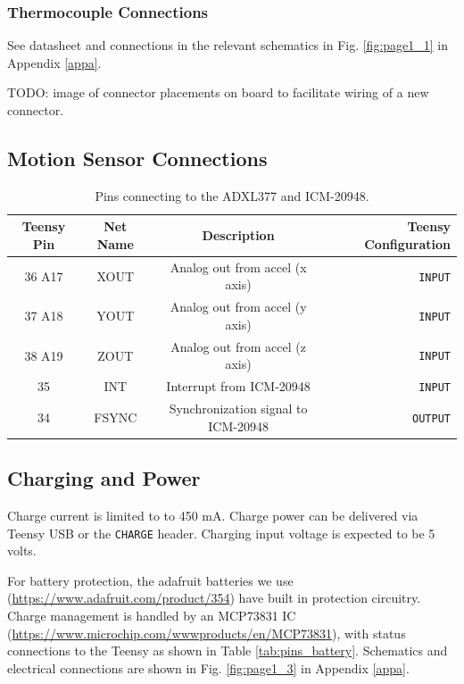 \documentclass{article}
\begin{document}
\subsubsection{Thermocouple Connections}
See datasheet and connections in the relevant schematics in Fig. \ref{fig:page1_1} in Appendix \ref{appa}.

TODO: image of connector placements on board to facilitate wiring of a new connector.


\subsection{Motion Sensor Connections}

\begin{table}[H]
    \centering
    \begin{tabular}{c|c|c|r}
    Teensy Pin & Net Name  & Description   & Teensy Configuration \\
    \hline 
    36 A17 & XOUT & Analog out from accel (x axis) & \texttt{INPUT} \\
    37 A18 & YOUT & Analog out from accel (y axis) & \texttt{INPUT} \\
    38 A19 & ZOUT & Analog out from accel (z axis) & \texttt{INPUT} \\
    35 & INT & Interrupt from ICM-20948 & \texttt{INPUT} \\
    34 & FSYNC & Synchronization signal to ICM-20948 & \texttt{OUTPUT} 
    \end{tabular}
    \caption{Pins connecting to the ADXL377 and ICM-20948.}
    \label{tab:pins_motionsensor}
\end{table}



\subsection{Charging and Power}

Charge current is limited to to 450 mA. Charge power can be delivered via Teensy USB or the \texttt{CHARGE} header. Charging input voltage is expected to be 5 volts.

For battery protection, the adafruit batteries we use (\url{https://www.adafruit.com/product/354}) have built in protection circuitry. Charge management is handled by an MCP73831 IC (\url{https://www.microchip.com/wwwproducts/en/MCP73831}), with status connections to the Teensy as shown in Table \ref{tab:pins_battery}. Schematics and electrical connections are shown in Fig. \ref{fig:page1_3} in Appendix \ref{appa}.
\end{document}
